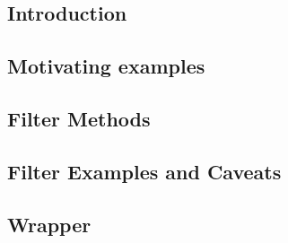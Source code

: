 
\subsection{Introduction}


\subsection{Motivating examples}


\subsection{Filter Methods}
%


\subsection{Filter Examples and Caveats}


\subsection{Wrapper}


%

%


